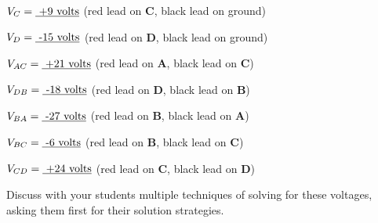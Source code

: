 $V_C = \hbox{\underbar{ +9 volts}}$ (red lead on {\bf C}, black lead on ground)

\vskip 5pt

$V_D = \hbox{\underbar{ -15 volts}}$ (red lead on {\bf D}, black lead on ground)

\vskip 20pt

\goodbreak

$V_{AC} = \hbox{\underbar{ +21 volts}}$ (red lead on {\bf A}, black lead on {\bf C})

\vskip 5pt

$V_{DB} = \hbox{\underbar{ -18 volts}}$ (red lead on {\bf D}, black lead on {\bf B})

\vskip 5pt

$V_{BA} = \hbox{\underbar{ -27 volts}}$ (red lead on {\bf B}, black lead on {\bf A})

\vskip 5pt

$V_{BC} = \hbox{\underbar{ -6 volts}}$ (red lead on {\bf B}, black lead on {\bf C})

\vskip 5pt

$V_{CD} = \hbox{\underbar{ +24 volts}}$ (red lead on {\bf C}, black lead on {\bf D})








Discuss with your students multiple techniques of solving for these voltages, asking them first for their solution strategies.




